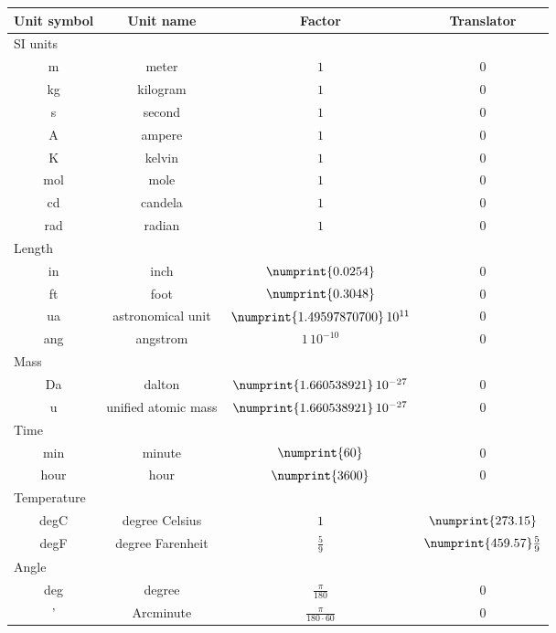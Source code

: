 \begin{longtable}{cccc}\toprule
Unit symbol & Unit name & Factor & Translator \\\midrule
\endhead
\multicolumn{4}{l}{\textsf{SI units}} \\\cmidrule(rl){1-2}
m   & meter    & $1$ & $0$ \\
kg  & kilogram & $1$ & $0$ \\
s   & second   & $1$ & $0$ \\
A   & ampere   & $1$ & $0$ \\
K   & kelvin   & $1$ & $0$ \\
mol & mole     & $1$ & $0$ \\
cd  & candela  & $1$ & $0$ \\
rad & radian   & $1$ & $0$ \\[5pt]
\multicolumn{4}{l}{\textsf{Length}} \\\cmidrule(rl){1-2}
in  &  inch              & $\numprint{0.0254}$                 & $0$ \\
ft  &  foot              & $\numprint{0.3048}$                 & $0$ \\
ua  &  astronomical unit & $\numprint{1.49597870700}\,10^{11}$ & $0$ \\
ang &  angstrom          & $1\,10^{-10}$                       & $0$ \\[5pt]
\multicolumn{4}{l}{\textsf{Mass}} \\\cmidrule(rl){1-2}
Da  &  dalton               & $\numprint{1.660538921}\,10^{-27}$ & $0$ \\
u   &  unified atomic mass  & $\numprint{1.660538921}\,10^{-27}$ & $0$ \\[5pt]
\multicolumn{4}{l}{\textsf{Time}} \\\cmidrule(rl){1-2}
min   &  minute & $\numprint{60}$   & $0$ \\
hour  &  hour   & $\numprint{3600}$ & $0$ \\[5pt]
\multicolumn{4}{l}{\textsf{Temperature}} \\\cmidrule(rl){1-2}
degC  &  degree Celsius   & $1$           & $\numprint{273.15}$ \\
degF  &  degree Farenheit & $\frac{5}{9}$ & $\numprint{459.57} \frac{5}{9}$ \\[5pt]
\multicolumn{4}{l}{\textsf{Angle}} \\\cmidrule(rl){1-2}
deg & degree    &  $\frac{\pi}{180}$                   & $0$ \\
'   & Arcminute &  $\frac{\pi}{180 \cdot 60}$          & $0$ \\

\end{longtable}
